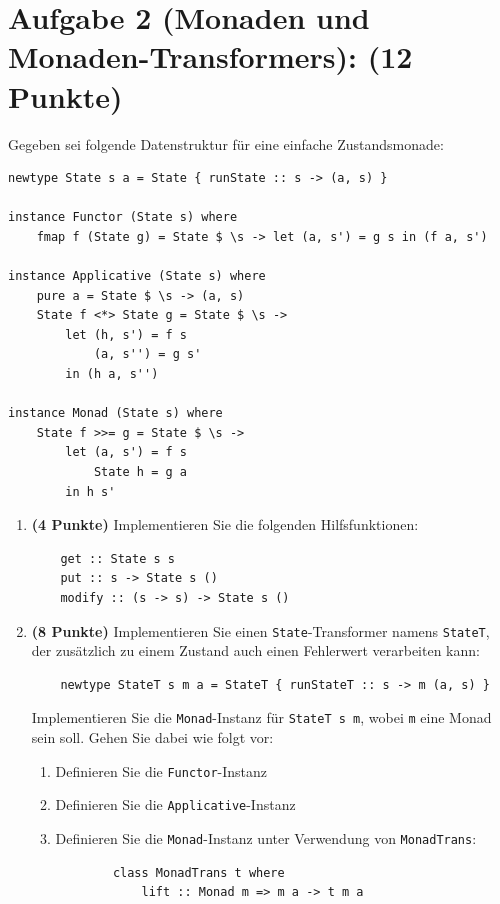 \documentclass[12pt,a4paper]{article}
\makeatletter
\def\cleardoublepage{\clearpage\if@twoside\ifodd\c@page\else%
\hbox{}%
\thispagestyle{empty}%
\newpage%
\if@twocolumn\hbox{}\newpage\fi\fi\fi}
\makeatother
\begin{document}
\cleardoublepage

\section*{Aufgabe 2 (Monaden und Monaden-Transformers): (12 Punkte)}

Gegeben sei folgende Datenstruktur für eine einfache Zustandsmonade:

\begin{verbatim}
newtype State s a = State { runState :: s -> (a, s) }

instance Functor (State s) where
    fmap f (State g) = State $ \s -> let (a, s') = g s in (f a, s')

instance Applicative (State s) where
    pure a = State $ \s -> (a, s)
    State f <*> State g = State $ \s ->
        let (h, s') = f s
            (a, s'') = g s'
        in (h a, s'')

instance Monad (State s) where
    State f >>= g = State $ \s ->
        let (a, s') = f s
            State h = g a
        in h s'
\end{verbatim}

\begin{enumerate}
    \item \textbf{(4 Punkte)} Implementieren Sie die folgenden Hilfsfunktionen:
    \begin{verbatim}
    get :: State s s
    put :: s -> State s ()
    modify :: (s -> s) -> State s ()
    \end{verbatim}
    
    \item \textbf{(8 Punkte)} Implementieren Sie einen \texttt{State}-Transformer namens \texttt{StateT}, der zusätzlich zu einem Zustand auch einen Fehlerwert verarbeiten kann:
    \begin{verbatim}
    newtype StateT s m a = StateT { runStateT :: s -> m (a, s) }
    \end{verbatim}
    
    Implementieren Sie die \texttt{Monad}-Instanz für \texttt{StateT s m}, wobei \texttt{m} eine Monad sein soll. Gehen Sie dabei wie folgt vor:
    \begin{enumerate}
        \item Definieren Sie die \texttt{Functor}-Instanz
        \item Definieren Sie die \texttt{Applicative}-Instanz
        \item Definieren Sie die \texttt{Monad}-Instanz unter Verwendung von \texttt{MonadTrans}:
        \begin{verbatim}
        class MonadTrans t where
            lift :: Monad m => m a -> t m a
        \end{verbatim}
    \end{enumerate}
\end{enumerate}
\end{document}
